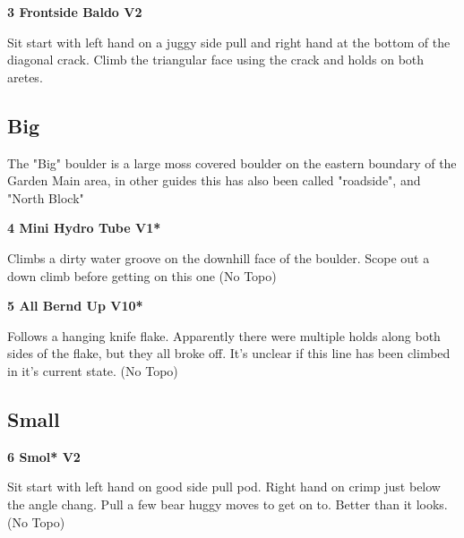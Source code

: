 \begin{multicols}{2}

					\label{rt:Frontside Baldo}
\colorbox{green!20}{
\parbox{0.95\linewidth}{
\textbf{
3 Frontside Baldo V2    
}
}
}

					\begin{adjustwidth}{0.5cm}{}				
					Sit start with left hand on a juggy side pull and right hand at the bottom of the diagonal crack. Climb the triangular face using the crack and holds on both aretes.
					\end{adjustwidth}
			\subsection*{Big}\label{bf:Big}
			The "Big" boulder is a large moss covered boulder on the eastern boundary of the Garden Main area, in other guides this has also been called "roadside", and "North Block"\\
			
					\label{rt:Mini Hydro Tube}
\colorbox{green!20}{
\parbox{0.95\linewidth}{
\textbf{
4 Mini Hydro Tube V1*  \warn 
}
}
}

					\begin{adjustwidth}{0.5cm}{}				
					Climbs a dirty water groove on the downhill face of the boulder. Scope out a down climb before getting on this one
						\newline (No Topo) 
					\end{adjustwidth}
					\label{rt:All Bernd Up}
\colorbox{red!20}{
\parbox{0.95\linewidth}{
\textbf{
5 All Bernd Up V10*  
}
}
}

					\begin{adjustwidth}{0.5cm}{}				
					Follows a hanging knife flake. Apparently there were multiple holds along both sides of the flake, but they all broke off. It's unclear if this line has been climbed in it's current state.
						\newline (No Topo) 
					\end{adjustwidth}
			\subsection*{Small}\label{bf:Small}
						
					\label{rt:Smol}
\colorbox{green!20}{
\parbox{0.95\linewidth}{
\textbf{
6 Smol* V2   
}
}
}

					\begin{adjustwidth}{0.5cm}{}				
					Sit start with left hand on good side pull pod. Right hand on crimp just below the angle chang. Pull a few bear huggy moves to get on to. Better than it looks.
						\newline (No Topo) 
					\end{adjustwidth}
\newpage


\end{multicols}
